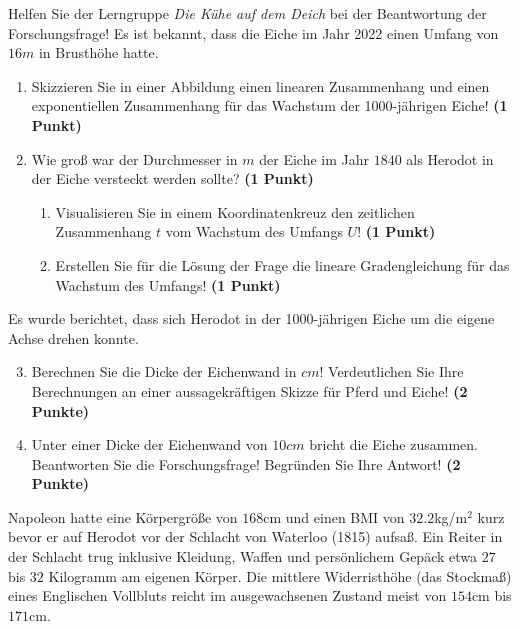 \documentclass[a4paper, 9pt]{scrartcl}\usepackage[]{graphicx}\usepackage[]{xcolor}
\begin{document}
\vspace{1Ex}

Helfen Sie der Lerngruppe \textit{Die Kühe auf dem Deich} bei der Beantwortung der Forschungsfrage! Es ist bekannt, dass die Eiche im Jahr 2022 einen Umfang von $16m$ in Brusthöhe hatte.

\begin{enumerate}
\item Skizzieren Sie in einer Abbildung einen linearen Zusammenhang und einen exponentiellen Zusammenhang für das Wachstum der 1000-jährigen Eiche! \textbf{(1 Punkt)}
\item Wie groß war der Durchmesser in $m$ der Eiche im Jahr $1840$ als Herodot in der Eiche versteckt werden sollte? \textbf{(1 Punkt)}
\begin{enumerate}
\item Visualisieren Sie in einem Koordinatenkreuz den zeitlichen Zusammenhang $t$ vom Wachstum des Umfangs $U$! \textbf{(1 Punkt)}
\item Erstellen Sie für die Lösung der Frage die lineare Gradengleichung für das Wachstum des Umfangs! \textbf{(1 Punkt)}
\end{enumerate}
\end{enumerate}

Es wurde berichtet, dass sich Herodot in der 1000-jährigen Eiche um die eigene Achse drehen konnte.

\begin{enumerate}
  \setcounter{enumi}{2}
\item Berechnen Sie die Dicke der Eichenwand in $cm$! Verdeutlichen Sie Ihre Berechnungen an einer aussagekräftigen Skizze für Pferd und Eiche! \textbf{(2 Punkte)} 
\item Unter einer Dicke der Eichenwand von $10cm$ bricht die Eiche zusammen. Beantworten Sie die Forschungsfrage! Begründen Sie Ihre Antwort! \textbf{(2 Punkte)} 
\end{enumerate}
 


Napoleon hatte eine Körpergröße von $168$cm und einen BMI von $32.2$kg/m$^2$ kurz bevor er auf Herodot vor der Schlacht von Waterloo (1815) aufsaß. Ein Reiter in der Schlacht trug inklusive Kleidung, Waffen und persönlichem Gepäck etwa $27$ bis $32$ Kilogramm am eigenen Körper. Die mittlere Widerristhöhe (das Stockmaß) eines Englischen Vollbluts reicht im ausgewachsenen Zustand meist von $154$cm bis  $171$cm.
\end{document}
